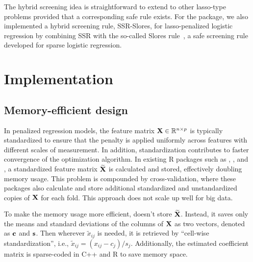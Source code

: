 The hybrid screening idea is straightforward to extend to other lasso-type problems provided that a corresponding safe rule exists. For the  package, we also implemented a hybrid screening rule, SSR-Slores, for lasso-penalized logistic regression by combining SSR with the so-called Slores rule~\citep{wang2014safe}, a safe screening rule developed for sparse logistic regression.

\section{Implementation}

\subsection{Memory-efficient design}

In penalized regression models, the feature matrix $\mathbf{X} \in \mathbb{R}^{n \times p}$ is typically standardized to ensure that the penalty is applied uniformly across features with different scales of measurement. In addition, standardization contributes to faster convergence of the optimization algorithm.  In existing R packages such as , , and , a standardized feature matrix $\widetilde{\mathbf{X}}$ is calculated and stored, effectively doubling memory usage. This problem is compounded by cross-validation, where these packages also calculate and store additional standardized and unstandardized copies of $\mathbf{X}$ for each fold. This approach does not scale up well for big data.

To make the memory usage more efficient,  doesn't store $\widetilde{\mathbf{X}}$. Instead, it saves only the means and standard deviations of the columns of $\mathbf{X}$ as two vectors, denoted as $\mathbf{c}$ and $\mathbf{s}$. Then wherever $\widetilde{x}_{ij}$ is needed, it is retrieved by ``cell-wise standardization'', i.e., $\widetilde{x}_{ij} = (x_{ij} - c_j) / s_j$. Additionally, the estimated coefficient matrix is sparse-coded in C++ and R to save memory space.

